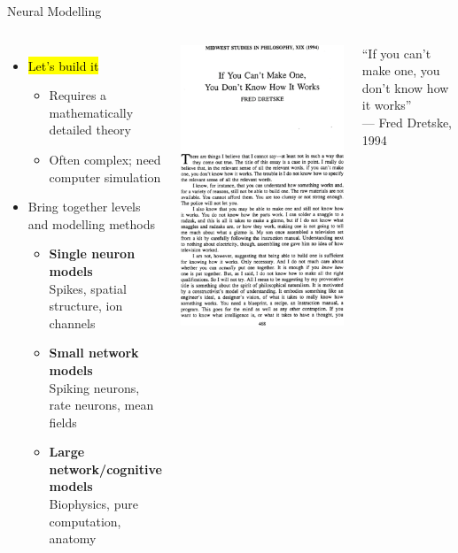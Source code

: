 \documentclass[handout,aspectratio=169]{beamer}
\begin{document}
\begin{frame}{Neural Modelling}
	\begin{overlayarea}{\textwidth}{7cm}
		\begin{columns}[c]
			\begin{itemize}
				\setlength\itemsep{0.25cm}
				\item<2-> \hl{Let's build it}\\[0.125cm]
				\begin{itemize}
					\setlength\itemsep{0.25cm}
					\item Requires a mathematically detailed theory
					\item Often complex; need computer simulation
				\end{itemize}
				\item<3-> Bring together levels and modelling methods\\[0.125cm]
				\begin{itemize}
					\setlength\itemsep{0.25cm}
					\item \textbf{Single neuron models}\\
					Spikes, spatial structure, ion channels\textellipsis
					\item \textbf{Small network models}\\
					Spiking neurons, rate neurons, mean fields\textellipsis
					\item \textbf{Large network/cognitive models}\\
					Biophysics, pure computation, anatomy\textellipsis
				\end{itemize}
			\end{itemize}
			\centering
			\includegraphics[width=0.5\columnwidth]{media/dretske_make_one.png}
			\begin{center}
				\color{aluminium4}
				\quotefont \enquote{If you can't make one, you don't know how it works} \\ --- Fred Dretske, 1994
			\end{center}
		\end{columns}
	\end{overlayarea}
\end{frame}
\end{document}
